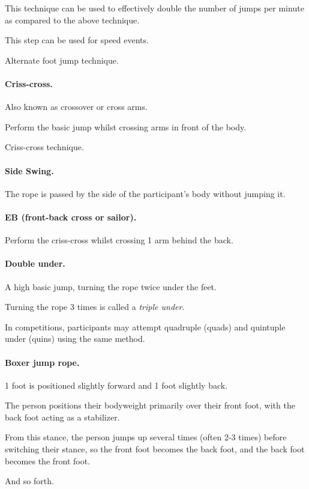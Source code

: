 \documentclass[oneside]{book}
\numberwithin{equation}{section}
\begin{document}
This technique can be used to effectively double the number of jumps per minute as compared to the above technique.

This step can be used for speed events.

\textsf{Alternate foot jump technique.}

\paragraph{Criss-cross.} Also known as crossover or cross arms.

Perform the basic jump whilst crossing arms in front of the body.

\textsf{Criss-cross technique.}

\paragraph{Side Swing.} The rope is passed by the side of the participant's body without jumping it.

\paragraph{EB (front-back cross or sailor).} Perform the criss-cross whilst crossing 1 arm behind the back.

\paragraph{Double under.} A high basic jump, turning the rope twice under the feet.

Turning the rope 3 times is called a \textit{triple under}.

In competitions, participants may attempt quadruple (quads) and quintuple under (quins) using the same method.

\paragraph{Boxer jump rope.} 1 foot is positioned slightly forward and 1 foot slightly back.

The person positions their bodyweight primarily over their front foot, with the back foot acting as a stabilizer.

From this stance, the person jumps up several times (often 2-3 times) before switching their stance, so the front foot becomes the back foot, and the back foot becomes the front foot.

And so forth.
\end{document}
